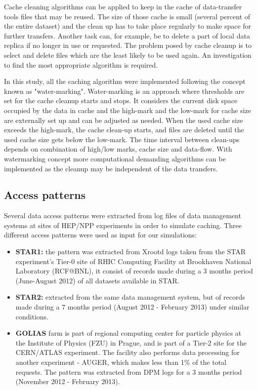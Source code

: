 \documentclass[english]{ddny}
\begin{document}
Cache cleaning algorithms can be applied to keep in the cache of data-transfer tools files that may be reused. The size of those cache is small (several percent of the entire dataset)  and the clean up has to take place regularly to make space for further transfers. Another task can, for example, be to delete a part of local data replica if no longer in use or requested. The problem posed by cache cleanup is to select and delete files which are the least likely to be used again. An investigation to find the most appropriate algorithm is required.

In this study, all the caching algorithm were implemented following the concept known as "water-marking". Water-marking is an approach where  thresholds are set for the cache cleanup starts and stops. It considers the current disk space occupied by the data in cache and the high-mark and the low-mark for cache size are externally set up and can be adjusted as needed. When the used cache size exceeds the high-mark, the cache clean-up starts, and files are deleted until the used cache size gets below the low-mark. The time interval between clean-ups depends on combination of high/low marks, cache size and data-flow. With watermarking concept more computational  demanding algorithms can be implemented as the cleanup may be independent of the data transfers.

\subsection{Access patterns}
Several data  access patterns were extracted from log files of data  management systems  at  sites of HEP/NPP  experiments in order to simulate caching.   Three  different  access patterns were used as input for our simulations:
\begin{itemize}
	\item[]\textbf{STAR1:} the pattern was extracted from Xrootd \cite{Xrootd} logs taken from the STAR experiment's Tier-0 site of RHIC Computing Facility at Brookhaven National Laboratory  (RCF@BNL), it consist of records made during a 3 months period (June-August 2012) of all datasets available in STAR.
	\item[]\textbf{STAR2:} extracted from the same data management system, but of records made during a 7 months period (August 2012 - February  2013) under similar conditions.
	\item[]\textbf{GOLIAS} farm is part of regional computing center for particle physics at the Institute of Physics (FZU) in Prague, and is part of a Tier-2 site for the CERN/ATLAS experiment. The facility also performs data processing for another experiment - AUGER, which makes less than  1\% of the total requests. The pattern was extracted from DPM \cite{DPM} logs for a 3 months period (November 2012 - February  2013).
\end{itemize}
\end{document}
